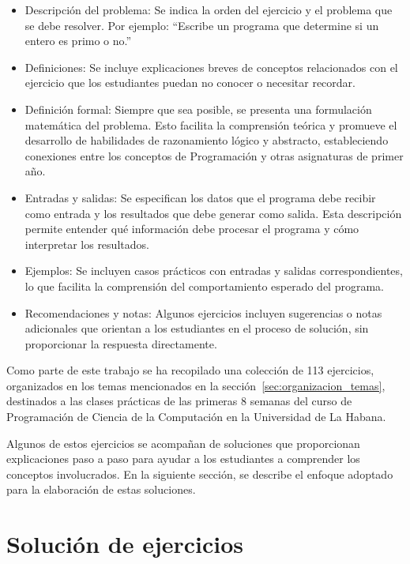 \documentclass{article}
\begin{document}
\begin{itemize}
    \item Descripción del problema:  
    Se indica la orden del ejercicio y el problema que se debe resolver. Por ejemplo: ``Escribe un programa que determine si un entero es primo o no.''

    \item Definiciones: 
    Se incluye explicaciones breves de conceptos relacionados con el ejercicio que los estudiantes puedan no conocer o necesitar recordar.

    \item Definición formal:
    Siempre que sea posible, se presenta una formulación matemática del problema. Esto facilita la comprensión teórica y promueve el desarrollo de habilidades de razonamiento lógico y abstracto, estableciendo conexiones entre los conceptos de Programación y otras asignaturas de primer año.
    
    \item Entradas y salidas:
    Se especifican los datos que el programa debe recibir como entrada y los resultados que debe generar como salida. Esta descripción permite entender qué información debe procesar el programa y cómo interpretar los resultados.

    \item Ejemplos:
    Se incluyen casos prácticos con entradas y salidas correspondientes, lo que facilita la comprensión del comportamiento esperado del programa.
    
    \item Recomendaciones y notas:  
     Algunos ejercicios incluyen sugerencias o notas adicionales que orientan a los estudiantes en el proceso de solución, sin proporcionar la respuesta directamente.
\end{itemize}

Como parte de este trabajo se ha recopilado una colección de 113 ejercicios, organizados en los temas mencionados en la sección~\ref{sec:organizacion_temas}, destinados a las clases prácticas de las primeras 8 semanas del curso de Programación de Ciencia de la Computación en la Universidad de La Habana.

Algunos de estos ejercicios se acompañan de soluciones que proporcionan explicaciones paso a paso para ayudar a los estudiantes a comprender los conceptos involucrados. En la siguiente sección, se describe el enfoque adoptado para la elaboración de estas soluciones.

\section{Solución de ejercicios}
\end{document}
